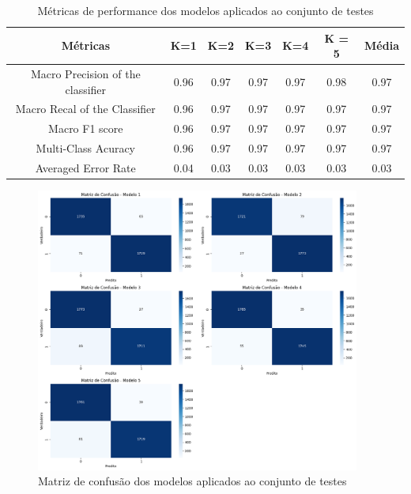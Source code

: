 \documentclass[]{abntex2}
\begin{document}
\begin{table}[H]
    \centering
    \begin{tabular}{|c|c|c|c|c|c|c|}
    \hline
    \rowcolor[HTML]{C0C0C0} 
    Métricas                          & K=1  & K=2  & K=3  & K=4  & K = 5 & Média \\ \hline
    Macro Precision of the classifier & 0.96 & 0.97 & 0.97 & 0.97 & 0.98 & 0.97  \\ \hline
    Macro Recal of the Classifier     & 0.96 & 0.97 & 0.97 & 0.97 & 0.97 & 0.97  \\ \hline
    Macro F1 score                    & 0.96 & 0.97 & 0.97 & 0.97 & 0.97 & 0.97  \\ \hline
    Multi-Class Acuracy               & 0.96 & 0.97 & 0.97 & 0.97 & 0.97 & 0.97  \\ \hline
    Averaged Error Rate                & 0.04 & 0.03 & 0.03 & 0.03 & 0.03 & 0.03  \\ \hline
    \end{tabular}
    \caption{Métricas de performance dos modelos aplicados ao conjunto de testes}
    \label{tab:acu1}
\end{table}

\begin{figure}[H]
    \centering 
    \includegraphics[width=0.95\textwidth]{imgs/ex2/confusion.png}
    \caption{Matriz de confusão dos modelos aplicados ao conjunto de testes}
    \label{fig:conf} %
\end{figure}
\end{document}
